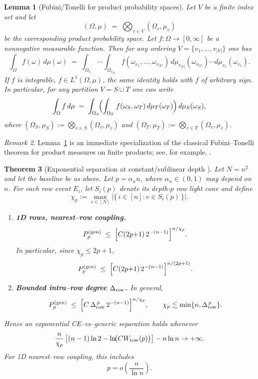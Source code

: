 \documentclass[a4paper,onecolumn,11pt,unpublished]{quantumarticle}
\newtheorem{theorem}{Theorem}
\newtheorem{lemma}[theorem]{Lemma}
\theoremstyle{remark}
\newtheorem{remark}[theorem]{Remark}
\begin{document}
\begin{lemma}[Fubini/Tonelli for product probability spaces]
\label{lem:fubini-product}
Let $V$ be a finite index set and let
\[
  (\Omega,\mu)\;=\;\bigotimes_{v\in V} (\Omega_v,\mu_v)
\]
be the corresponding product probability space. Let
$f:\Omega\to[0,\infty]$ be a nonnegative measurable function. Then for
any ordering $V=\{v_1,\dots,v_{|V|}\}$ one has
\begin{equation}
\label{eq:fubini-iterated}
  \int_{\Omega} f(\omega)\,d\mu(\omega)
  \;=\;
  \int_{\Omega_{v_1}}\!\cdots\!\int_{\Omega_{v_{|V|}}}
    f(\omega_{v_1},\dots,\omega_{v_{|V|}})
  \,d\mu_{v_{|V|}}(\omega_{v_{|V|}})\cdots d\mu_{v_1}(\omega_{v_1}).
\end{equation}
If $f$ is integrable, $f\in L^1(\Omega,\mu)$, the same identity holds
with $f$ of arbitrary sign. In particular, for any partition
$V=S\cup T$ one can write
\[
  \int_{\Omega} f\,d\mu
  \;=\;
  \int_{\Omega_S}\!\Bigl(\int_{\Omega_T} f(\omega_S,\omega_T)\,
      d\mu_T(\omega_T)\Bigr)\,d\mu_S(\omega_S),
\]
where $(\Omega_S,\mu_S):=\bigotimes_{v\in S}(\Omega_v,\mu_v)$ and
$(\Omega_T,\mu_T):=\bigotimes_{v\in T}(\Omega_v,\mu_v)$.
\end{lemma}

\begin{remark}
Lemma~\ref{lem:fubini-product} is an immediate specialization of the
classical Fubini--Tonelli theorem for product measures on finite
products; see, for example, \cite[Section~2.5, Theorems~2.37 and~2.39]{Folland1999}.
\end{remark}

\begin{theorem}[Exponential separation at constant/sublinear depth ]
\label{thm:generic-const-app}
Let $N=n^2$ and let the baseline be as above. Let $p=\alpha_n n$, where
$\alpha_n\in(0,1)$ may depend on $n$. For each row event $E_i$, let $S_i(p)$
denote its depth-$p$ row light cone and define
\[
  \chi_p
  :=
  \max_{v\in[N]}
  \left|\{\,i\in[n]: v\in S_i(p)\,\}\right|.
\]
\begin{enumerate}
\item[(A)] \textbf{1D rows, nearest–row coupling.}
\[
  P_{p}^{\mathrm{(gen)}}
  \;\le\;
  \Bigl[C(2p{+}1)\,2^{-(n-1)}\Bigr]^{n/\chi_p}.
\]
In particular, since $\chi_p\le 2p+1$,
\[
  P_{p}^{\mathrm{(gen)}}
  \;\le\;
  \Bigl[C(2p{+}1)\,2^{-(n-1)}\Bigr]^{n/(2p+1)}.
\]

\item[(B)] \textbf{Bounded intra–row degree $\Delta_{\rm row}$.}
In general,
\[
  P_{p}^{\mathrm{(gen)}}
  \;\le\;
  \Bigl[C\,\Delta_{\rm row}^{\,p}\,2^{-(n-1)}\Bigr]^{n/\chi_p},
  \qquad
  \chi_p\lesssim \min\{n,\Delta_{\rm row}^{\,p}\}.
\]
\end{enumerate}
Hence an exponential CE–vs–generic separation holds whenever
\[
  \frac{n}{\chi_p}
  \left[
    (n-1)\ln 2
    -
    \ln\!\bigl(CW_{\rm row}(p)\bigr)
  \right]
  -
  n\ln n
  \to +\infty.
\]
For 1D nearest–row coupling, this includes
\[
  p=o\!\left(\frac{n}{\ln n}\right).
\]
\end{theorem}
\end{document}

